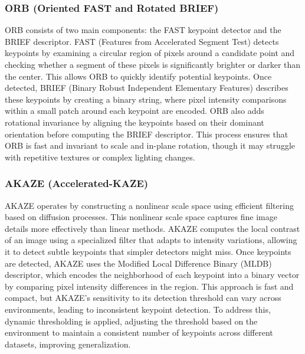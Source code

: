 \subsubsection{ORB (Oriented FAST and Rotated BRIEF)}
ORB consists of two main components: the FAST keypoint detector and the BRIEF descriptor. FAST (Features from Accelerated Segment Test) detects keypoints by examining a circular region of pixels around a candidate point and checking whether a segment of these pixels is significantly brighter or darker than the center. This allows ORB to quickly identify potential keypoints. Once detected, BRIEF (Binary Robust Independent Elementary Features) describes these keypoints by creating a binary string, where pixel intensity comparisons within a small patch around each keypoint are encoded. ORB also adds rotational invariance by aligning the keypoints based on their dominant orientation before computing the BRIEF descriptor. This process ensures that ORB is fast and invariant to scale and in-plane rotation, though it may struggle with repetitive textures or complex lighting changes.

\subsubsection*{AKAZE (Accelerated-KAZE)}
AKAZE operates by constructing a nonlinear scale space using efficient filtering based on diffusion processes. This nonlinear scale space captures fine image details more effectively than linear methods. AKAZE computes the local contrast of an image using a specialized filter that adapts to intensity variations, allowing it to detect subtle keypoints that simpler detectors might miss. Once keypoints are detected, AKAZE uses the Modified Local Difference Binary (MLDB) descriptor, which encodes the neighborhood of each keypoint into a binary vector by comparing pixel intensity differences in the region. This approach is fast and compact, but AKAZE’s sensitivity to its detection threshold can vary across environments, leading to inconsistent keypoint detection. To address this, dynamic thresholding is applied, adjusting the threshold based on the environment to maintain a consistent number of keypoints across different datasets, improving generalization.

